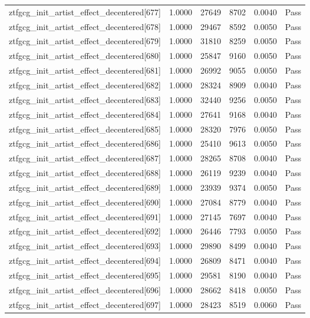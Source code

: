 \begin{table}[htbp]
\begin{tabular}{llrrll}
ztfgcg\_init\_artist\_effect\_decentered[677] & 1.0000 & 27649 & 8702 & 0.0040 & Pass \\
ztfgcg\_init\_artist\_effect\_decentered[678] & 1.0000 & 29467 & 8592 & 0.0050 & Pass \\
ztfgcg\_init\_artist\_effect\_decentered[679] & 1.0000 & 31810 & 8259 & 0.0050 & Pass \\
ztfgcg\_init\_artist\_effect\_decentered[680] & 1.0000 & 25847 & 9160 & 0.0050 & Pass \\
ztfgcg\_init\_artist\_effect\_decentered[681] & 1.0000 & 26992 & 9055 & 0.0050 & Pass \\
ztfgcg\_init\_artist\_effect\_decentered[682] & 1.0000 & 28324 & 8909 & 0.0040 & Pass \\
ztfgcg\_init\_artist\_effect\_decentered[683] & 1.0000 & 32440 & 9256 & 0.0050 & Pass \\
ztfgcg\_init\_artist\_effect\_decentered[684] & 1.0000 & 27641 & 9168 & 0.0040 & Pass \\
ztfgcg\_init\_artist\_effect\_decentered[685] & 1.0000 & 28320 & 7976 & 0.0050 & Pass \\
ztfgcg\_init\_artist\_effect\_decentered[686] & 1.0000 & 25410 & 9613 & 0.0050 & Pass \\
ztfgcg\_init\_artist\_effect\_decentered[687] & 1.0000 & 28265 & 8708 & 0.0040 & Pass \\
ztfgcg\_init\_artist\_effect\_decentered[688] & 1.0000 & 26119 & 9239 & 0.0040 & Pass \\
ztfgcg\_init\_artist\_effect\_decentered[689] & 1.0000 & 23939 & 9374 & 0.0050 & Pass \\
ztfgcg\_init\_artist\_effect\_decentered[690] & 1.0000 & 27084 & 8779 & 0.0040 & Pass \\
ztfgcg\_init\_artist\_effect\_decentered[691] & 1.0000 & 27145 & 7697 & 0.0040 & Pass \\
ztfgcg\_init\_artist\_effect\_decentered[692] & 1.0000 & 26446 & 7793 & 0.0050 & Pass \\
ztfgcg\_init\_artist\_effect\_decentered[693] & 1.0000 & 29890 & 8499 & 0.0040 & Pass \\
ztfgcg\_init\_artist\_effect\_decentered[694] & 1.0000 & 26809 & 8471 & 0.0040 & Pass \\
ztfgcg\_init\_artist\_effect\_decentered[695] & 1.0000 & 29581 & 8190 & 0.0040 & Pass \\
ztfgcg\_init\_artist\_effect\_decentered[696] & 1.0000 & 28662 & 8418 & 0.0050 & Pass \\
ztfgcg\_init\_artist\_effect\_decentered[697] & 1.0000 & 28423 & 8519 & 0.0060 & Pass \\

\end{tabular}
\end{table}
